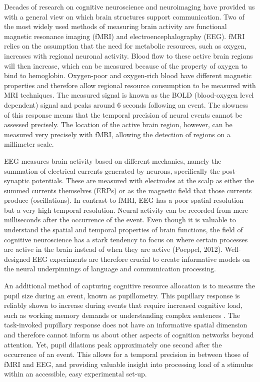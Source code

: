 Decades of research on cognitive neuroscience and neuroimaging have provided us with a general view on which brain structures support communication. Two of the most widely used methods of measuring brain activity are functional magnetic resonance imaging (fMRI) and electroencephalography (EEG). fMRI relies on the assumption that the need for metabolic resources, such as oxygen, increases with regional neuronal activity. Blood flow to these active brain regions will then increase, which can be measured because of the property of oxygen to bind to hemoglobin. Oxygen-poor and oxygen-rich blood have different magnetic properties and therefore allow regional resource consumption to be measured with MRI techniques. The measured signal is known as the BOLD (blood-oxygen level dependent) signal and peaks around 6 seconds following an event. The slowness of this response means that the temporal precision of neural events cannot be assessed precisely. The location of the active brain region, however, can be measured very precisely with fMRI, allowing the detection of regions on a millimeter scale. 

EEG measures brain activity based on different mechanics, namely the summation of electrical currents generated by neurons, specifically the post-synaptic potentials. These are measured with electrodes at the scalp as either the summed currents themselves (ERPs) or as the magnetic field that those currents produce (oscillations). In contrast to fMRI, EEG has a poor spatial resolution but a very high temporal resolution. Neural activity can be recorded from mere milliseconds after the occurrence of the event. Even though it is valuable to understand the spatial and temporal properties of brain functions, the field of cognitive neuroscience has a stark tendency to focus on where certain processes are active in the brain instead of when they are active (Poeppel, 2012). Well-designed EEG experiments are therefore crucial to create informative models on the neural underpinnings of language and communication processing. 


An additional method of capturing cognitive resource allocation is to measure the pupil size during an event, known as pupillometry. This pupillary response is reliably shown to increase during events that require increased cognitive load, such as working memory demands or understanding complex sentences \citep{beatty1982}. The task-invoked pupillary response does not have an informative spatial dimension and therefore cannot inform us about other aspects of cognition networks beyond attention. Yet, pupil dilations peak approximately one second after the occurrence of an event. This allows for a temporal precision in between those of fMRI and EEG, and providing valuable insight into processing load of a stimulus within an accessible, easy experimental set-up. 

